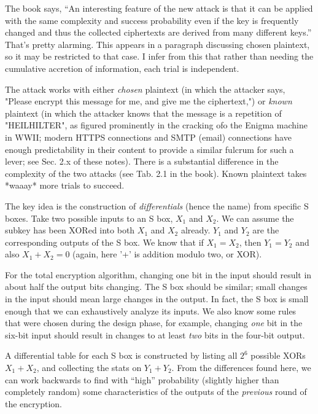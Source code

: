 The book says, ``An interesting feature of the new attack is that it
can be applied with the same complexity and success probability even
if the key is frequently changed and thus the collected ciphertexts
are derived from many different keys.''  \aono{} That's pretty alarming.  This
appears in a paragraph discussing chosen plaintext, so it may be
restricted to that case.  I infer from this that rather than needing
the cumulative accretion of information, each trial is independent.

The attack works with either \emph{chosen} plaintext (in which the attacker
says, "Please encrypt this message for me, and give me the
ciphertext,") or \emph{known} plaintext (in which the attacker knows that
the message is a repetition of "HEILHILTER", as figured prominently in
the cracking ofo the Enigma machine in WWII; modern HTTPS connections and
SMTP (email) connections have enough predictability in their content
to provide a similar fulcrum for such a lever; see Sec. 2.x of these
notes).  There is a substantial difference in the complexity of the
two attacks (see Tab. 2.1 in the book).  Known plaintext takes *waaay*
more trials to succeed.  


The key idea is the construction of \emph{differentials} (hence the name)
from specific S boxes.  Take two possible inputs to an S box, $X_1$
and $X_2$.  We can assume the subkey has been XORed into both $X_1$
and $X_2$ already.  $Y_1$ and $Y_2$ are the corresponding outputs of the
S box.  We know that if $X_1 = X_2$, then $Y_1 = Y_2$ and also $X_1 +
X_2 = 0$ (again, here '+' is addition modulo two, or XOR).

For the total encryption algorithm, changing one bit in the input
should result in about half the output bits changing.  The S box
should be similar; small changes in the input should mean large
changes in the output.  In fact, the S box is small enough that we can
exhaustively analyze its inputs.  We also know some rules that were
chosen during the design phase, for example, changing \emph{one} bit
in the six-bit input should result in changes to at least \emph{two}
bits in the four-bit output.

A differential table for each S box is constructed by listing all
$2^6$ possible XORs $X_1 + X_2$, and collecting the stats on $Y_1 +
Y_2$.  From the differences found here, we can work backwards to find
with ``high'' probability (slightly higher than completely random)
some characteristics of the outputs of the \emph{previous}
round of the encryption.

